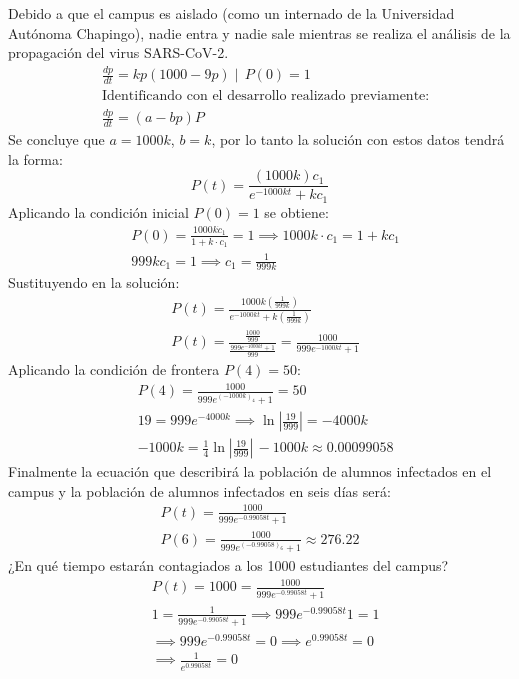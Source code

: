 Debido a que el campus es aislado (como un internado de la Universidad Autónoma Chapingo), nadie entra y nadie sale mientras se realiza el análisis de la propagación del virus SARS-CoV-2.
\begin{align*}
    &\frac{dp}{dt} = kp(1000- 9p)\mid \, P(0) = 1\\
    &\text{Identificando con el desarrollo realizado previamente:}\\
    &\frac{dp}{dt} =(a - bp)P
\end{align*}
Se concluye que $a = 1000k$, $b=k$, por lo tanto la solución con estos datos tendrá la forma:
\begin{equation*}
    P(t) = \frac{(1000k)c_1}{e^{ - 1000kt} + kc_1}
\end{equation*}
Aplicando la condición inicial $P(0) = 1$ se obtiene:
\begin{align*}
    &P(0) = \frac{1000k\dot c_1}{1 + k\cdot c_1} = 1\implies 1000k\cdot c_1 = 1 + kc_1\\
    &999kc_1 = 1\implies c_1 = \frac{1}{999k}
\end{align*}
Sustituyendo en la solución:
\begin{align*}
    &P(t) = \frac{1000k \left( \frac{1}{999k} \right)}{e^{ - 1000kt} + k\left( \frac{1}{999k} \right)}\\
    &P(t) = \frac{\frac{1000}{999}}{\frac{999e^{ - 1000kt} + 1}{999}} = \frac{1000}{999e^{ - 1000kt} + 1}
\end{align*}
Aplicando la condición de frontera $P(4) = 50$:
\begin{align*}
    &P(4) = \frac{1000}{999e^{ (- 1000k)_4} + 1} = 50\\
    &19 = 999e^{ - 4000k}\implies \ln{\left\lvert \frac{19}{999}\right\rvert } =- 4000k\\
    &- 1000k = \frac{1}{4}\ln{\left\lvert \frac{19}{999}\right\rvert }\, -1000k\approx 0.00099058
\end{align*}
Finalmente la ecuación que describirá la población de alumnos infectados en el campus y la población de alumnos infectados en seis días será:
\begin{align*}
    P(t) = \frac{1000}{999e^{ - 0.99058t} + 1}\\
    P(6) = \frac{1000}{999e^{ (- 0.99058)_6} + 1}\approx 276.22 
\end{align*}
¿En qué tiempo estarán contagiados a los 1000 estudiantes del campus?
\begin{align*}
    &P(t) = 1000 = \frac{1000}{999e^{ - 0.99058t} + 1}\\
    &1 = \frac{1}{999e^{ - 0.99058t} + 1}\implies 999e^{ - 0.99058t} 1 = 1\\
    &\implies 999e^{ - 0.99058t} = 0\implies e^{0.99058t} = 0\\
    &\implies \frac{1}{e^{0.99058t}} = 0
\end{align*}

